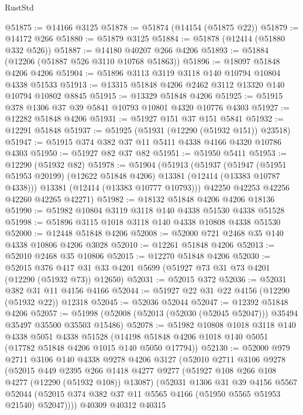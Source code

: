 \begin{lexlean}{RustStd}
\begin{coremodule}
{\begin{coremodule}
{{{{{{{{{{{{{{{{{{{{{{{{{{{{{{{{{{{{{{{{{{{{{{{{{{@51875 := @14166 @3125
@51878 := @51874 (@14154 (@51875 @22))
@51879 := @14172 @266
@51880 := @51879 @3125
@51884 := @51878 (@12414 (@51880 @332 @526))
@51887 := @14180 @40207 @266 @4206
@51893 := @51884 (@12206 (@51887 @526 @3110 @10768 @51863))
@51896 := @18097 @51848 @4206 @4206
@51904 := @51896 @3113 @3119 @3118 @140 @10794 @10804 @4338 @51533
@51913 := @13315 @51848 @4206 @2462 @3112 @13320 @140 @10794 @10802 @8845
@51915 := @13329 @51848 @4206
@51925 := @51915 @378 @1306 @37 @39 @5841 @10793 @10801 @4320 @10776 @4303
@51927 := @12282 @51848 @4206
@51931 := @51927 @151 @37 @151 @5841
@51932 := @12291 @51848
@51937 := @51925 (@51931 (@12290 (@51932 @151)) @23518)
@51947 := @51915 @374 @382 @37 @11 @5411 @4338 @4166 @4320 @10786 @4303
@51950 := @51927 @82 @37 @82
@51951 := @51950 @5411
@51953 := @12290 (@51932 @82)
@51978 := @51904
    (@51913
      (@51937
        (@51947 (@51951 @51953 @20199) (@12622 @51848 @4206) @13381 (@12414 (@13383 @10787 @4338)))
        @13381
        (@12414 (@13383 @10777 @10793)))
      @42250
      @42253
      @42256
      @42260
      @42265
      @42271)
@51982 := @18132 @51848 @4206 @4206 @18136
@51990 := @51982 @10804 @3119 @3118 @140 @4338 @51530 @4338 @51528
@51998 := @51896 @3115 @1018 @3118 @140 @4338 @10808 @4338 @51530
@52000 := @12448 @51848 @4206
@52008 := @52000 @721 @2468 @35 @140 @4338 @10806 @4206 @3028
@52010 := @12261 @51848 @4206
@52013 := @52010 @2468 @35 @10806
@52015 := @12270 @51848 @4206
@52030 := @52015
    @376
    @417
    @31
    @33
    @4201
    @5699
    (@51927 @73 @31 @73 @4201 (@12290 (@51932 @73)) @12650)
@52031 := @52015 @372
@52036 := @52031 @382 @31 @11 @4156 @4166
@52044 := @51927 @22 @31 @22 @4156 (@12290 (@51932 @22)) @12318
@52045 := @52036 @52044
@52047 := @12392 @51848 @4206
@52057 := @51998 (@52008 (@52013 (@52030 (@52045 @52047))) @35494 @35497 @35500 @35503 @15486)
@52078 := @51982
    @10808
    @1018
    @3118
    @140
    @4338
    @5051
    @4338
    @51528
    (@14198 @51848 @4206 @1018 @140 @5051 (@17782 @51848 @4206 @1015 @140 @5050 @17794))
@52130 := @52000
    @979
    @2711
    @3106
    @140
    @4338
    @9278
    @4206
    @3127
    (@52010
      @2711
      @3106
      @9278
      (@52015
        @449
        @2395
        @266
        @1418
        @4277
        @9277
        (@51927 @108 @266 @108 @4277 (@12290 (@51932 @108)) @13087)
        (@52031
          @1306
          @31
          @39
          @4156
          @5567
          @52044
          (@52015 @374 @382 @37 @11 @5565 @4166 (@51950 @5565 @51953 @21540) @52047))))
    @40309
    @40312
    @40315
}}}}}}}}}}}}}}}}}}}}}}}}}}}}}}}}}}}}}}}}}}}}}}}}}}
\end{coremodule}}
\end{coremodule}
\end{lexlean}
